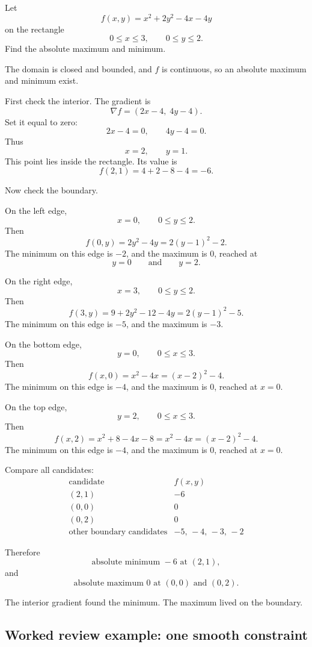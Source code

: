 Let
\[
    f(x,y)=x^2+2y^2-4x-4y
\]
on the rectangle
\[
    0\le x\le 3,
    \qquad
    0\le y\le 2.
\]
Find the absolute maximum and minimum.

The domain is closed and bounded, and \(f\) is continuous, so an absolute maximum and
minimum exist.

First check the interior.  The gradient is
\[
    \nabla f=(2x-4,\;4y-4).
\]
Set it equal to zero:
\[
    2x-4=0,
    \qquad
    4y-4=0.
\]
Thus
\[
    x=2,
    \qquad
    y=1.
\]
This point lies inside the rectangle.  Its value is
\[
    f(2,1)=4+2-8-4=-6.
\]

Now check the boundary.

On the left edge,
\[
    x=0,\qquad 0\le y\le2.
\]
Then
\[
    f(0,y)=2y^2-4y=2(y-1)^2-2.
\]
The minimum on this edge is \(-2\), and the maximum is \(0\), reached at
\[
    y=0
    \qquad\text{and}\qquad
    y=2.
\]

On the right edge,
\[
    x=3,\qquad 0\le y\le2.
\]
Then
\[
    f(3,y)=9+2y^2-12-4y=2(y-1)^2-5.
\]
The minimum on this edge is \(-5\), and the maximum is \(-3\).

On the bottom edge,
\[
    y=0,\qquad 0\le x\le3.
\]
Then
\[
    f(x,0)=x^2-4x=(x-2)^2-4.
\]
The minimum on this edge is \(-4\), and the maximum is \(0\), reached at \(x=0\).

On the top edge,
\[
    y=2,\qquad 0\le x\le3.
\]
Then
\[
    f(x,2)=x^2+8-4x-8=x^2-4x=(x-2)^2-4.
\]
The minimum on this edge is \(-4\), and the maximum is \(0\), reached at \(x=0\).

Compare all candidates:
\[
\begin{array}{c|c}
\text{candidate} & f(x,y) \\ \hline
(2,1) & -6\\
(0,0) & 0\\
(0,2) & 0\\
\text{other boundary candidates} & -5,\,-4,\,-3,\,-2
\end{array}
\]

Therefore
\[
\boxed{
    \text{absolute minimum }-6\text{ at }(2,1),
}
\]
and
\[
\boxed{
    \text{absolute maximum }0\text{ at }(0,0)\text{ and }(0,2).
}
\]

The interior gradient found the minimum.  The maximum lived on the boundary.

\subsection{Worked review example: one smooth constraint}

